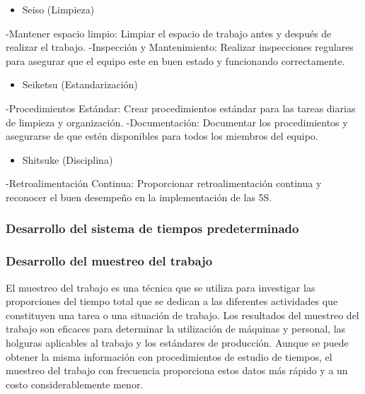     \begin{itemize}
        \item Seiso (Limpieza)
    \end{itemize}
    -Mantener espacio limpio: Limpiar el espacio de trabajo antes y después de realizar el trabajo.
    \newline
    -Inspección y Mantenimiento: Realizar inspecciones regulares para asegurar que el equipo este en buen estado y funcionando correctamente.
    
    \begin{itemize}
        \item Seiketsu (Estandarización)
    \end{itemize}
    
    -Procedimientos Estándar: Crear procedimientos estándar para las tareas diarias de limpieza y organización.
    \newline
    -Documentación: Documentar los procedimientos y asegurarse de que estén disponibles para todos los miembros del equipo.
    
    \begin{itemize}
        \item Shitsuke (Disciplina)
    \end{itemize}
    
    -Retroalimentación Continua: Proporcionar retroalimentación continua y reconocer el buen desempeño en la implementación de las 5S.
    
    
    
    \subsubsection{Desarrollo del sistema de tiempos predeterminado}
    \subsubsection{Desarrollo del muestreo del trabajo}
    El muestreo del trabajo es una técnica que se utiliza para investigar las proporciones del tiempo total que se dedican a las diferentes actividades que constituyen una tarea o una situación de trabajo. Los resultados del muestreo del trabajo son eficaces para determinar la utilización de máquinas y personal, las holguras aplicables al trabajo y los estándares de producción. Aunque se puede obtener la misma información con procedimientos de estudio de tiempos, el muestreo del trabajo con frecuencia proporciona estos datos más rápido y a un costo considerablemente menor.
